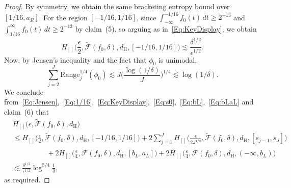\documentclass[a4paper,12pt]{article}
\begin{document}
\begin{proof}
By symmetry, we obtain the same bracketing entropy bound over $[1/16, a_R]$.  For the region $[-1/16, 1/16]$, since $\int_{-\infty}^{-1/16} f_0(t) \,dt \geq 2^{-13}$ and $\int_{1/16}^\infty f_0(t) \,dt \geq 2^{-13}$ by claim~(5), so arguing as in~\eqref{Eq:KeyDisplay}, we obtain
\begin{equation}
\label{Eq:1/16}
 H_{[]}\biggl( \frac{\epsilon}{2}, \tilde{\mathcal{F}}(f_0, \delta), d_{\mathrm{H}}, [-1/16, 1/16] \biggr) \lesssim \frac{\delta^{1/2} }{\epsilon^{1/2}}.
\end{equation}
Now, by Jensen's inequality and the fact that $\phi_0$ is unimodal,
\begin{equation}
\label{Eq:Jensen}
\sum_{j=2}^J \mathrm{Range}_j^{1/4}(\phi_0) \lesssim J \biggl(\frac{\log(1/\delta)}{J}\biggr)^{1/4} \lesssim \log(1/\delta). 
\end{equation}
We conclude from~\eqref{Eq:Jensen},~\eqref{Eq:1/16},~\eqref{Eq:KeyDisplay},~\eqref{Eq:s0},~\eqref{Eq:bL},~\eqref{Eq:bLaL} and claim~(6) that
  \begin{align*}
    & H_{[]} \bigl( \epsilon, \tilde{\mathcal{F}}(f_0, \delta), d_{\mathrm{H}} \bigr) \\
    &\leq H_{[]}\biggl( \frac{\epsilon}{2}, \tilde{\mathcal{F}}(f_0, \delta), d_{\mathrm{H}}, [-1/16, 1/16] \biggr) + 2\sum_{j=1}^J H_{[]}\biggl( \frac{\epsilon}{2J^{1/2}}, \tilde{\mathcal{F}}(f_0, \delta), d_{\mathrm{H}}, [s_{j-1}, s_J] \biggr) \\
&\hspace{2cm}+ 2 H_{[]}\biggl( \frac{\epsilon}{4}, \tilde{\mathcal{F}}(f_0, \delta), d_{\mathrm{H}}, [b_L,a_L] \biggr) + 2H_{[]}\biggl( \frac{\epsilon}{4}, \tilde{\mathcal{F}}(f_0, \delta), d_{\mathrm{H}}, (-\infty, b_L) \biggr)
\\
  & \lesssim \frac{\delta^{1/2}}{\epsilon^{1/2}} \log^{5/4}\frac{1}{\delta},
  \end{align*}
as required.
\end{proof}
\end{document}

